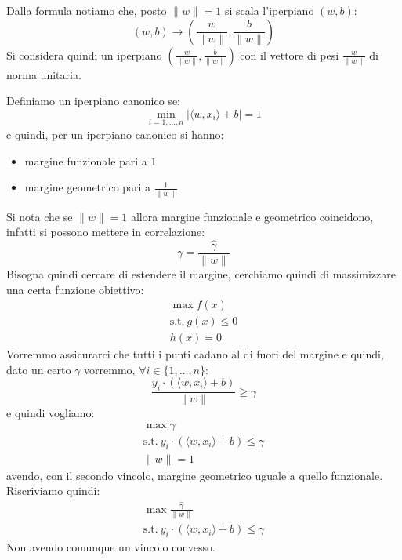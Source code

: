 Dalla formula notiamo che, posto $\| w \| = 1$ si scala l'iperpiano $(w, b)$:
\begin{equation}
    (w, b) \to \left(\frac{w}{\|w\|}, \frac{b}{\| w\|}\right)
\end{equation}
Si considera quindi un iperpiano $\left(\frac{w}{\|w\|}, \frac{b}{\| w\|}\right)$
con il vettore di pesi $\frac{w}{\| w \|}$ di norma unitaria.
\begin{definizione}
    Definiamo un iperpiano canonico se:
    \begin{equation}
        \min_{i = 1, \dots, n} |\langle w, x_i \rangle + b| =  1
    \end{equation}
    e quindi, per un iperpiano canonico si hanno:
    \begin{itemize}
        \item margine funzionale pari a $1$
        \item margine geometrico pari a $\frac{1}{\| w \|}$
    \end{itemize}
\end{definizione}
Si nota che se $\| w \| = 1$ allora margine funzionale e geometrico coincidono,
infatti si possono mettere in correlazione:
\begin{equation}
    \gamma = \frac{\hat{\gamma}}{\| w \|}
\end{equation}
Bisogna quindi cercare di estendere il margine, cerchiamo quindi di massimizzare
una certa funzione obiettivo:
\begin{equation*}
    \begin{aligned}
        \max f(x) \\ \text{s.t.} \ g(x) \leq 0 \\ h(x) = 0
    \end{aligned}
\end{equation*}
Vorremmo assicurarci che tutti i punti cadano al di fuori del margine e quindi,
dato un certo $\gamma$ vorremmo, $\forall i \in \{1, \dots, n\}$:
\begin{equation}
    \frac{y_i \cdot (\langle w, x_i \rangle + b)}{\| w \|} \geq \gamma
\end{equation}
e quindi vogliamo:
\begin{equation*}
    \begin{aligned}
        \max \gamma \\ \text{s.t.} \ y_i \cdot (\langle w, x_i \rangle + b) \leq \gamma \\ \| w \| = 1
    \end{aligned}
\end{equation*}
avendo, con il secondo vincolo, margine geometrico uguale a quello funzionale.
Riscriviamo quindi:
\begin{equation*}
    \begin{aligned}
        \max \frac{\hat{\gamma}}{\|w\|} \\ \text{s.t.} \ y_i \cdot (\langle w, x_i \rangle + b) \leq \gamma
    \end{aligned}
\end{equation*}
Non avendo comunque un vincolo convesso.

